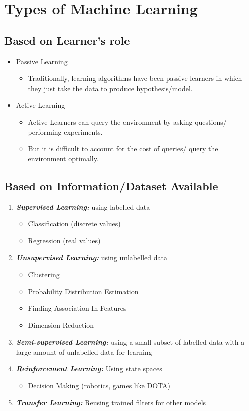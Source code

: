 \documentclass[a4paper]{article}
\begin{document}
\section{Types of Machine Learning}
\subsection{Based on Learner's role}
\begin{itemize}
	\item Passive Learning
	\begin{itemize}[label=$\circ$]
		\item Traditionally, learning algorithms have been passive learners in which they just take the data to produce hypothesis/model.
	\end{itemize}
	\item Active Learning
	\begin{itemize}[label=$\circ$]
		\item Active Learners can query the environment by asking questions/ performing experiments.
		\item But it is difficult to account for the cost of queries/ query the environment optimally.
	\end{itemize}
\end{itemize}
\subsection{Based on Information/Dataset Available}
\begin{enumerate}
	\item \textbf{\textit{Supervised Learning:}} using labelled data
	\begin{itemize}[label=$\circ$]
		\item Classification (discrete values)
		\item Regression (real values)
	\end{itemize}
	\item \textbf{\textit{Unsupervised Learning:}} using unlabelled data
	\begin{itemize}[label=$\circ$]
		\item Clustering
		\item Probability Distribution Estimation
		\item Finding Association In Features
		\item Dimension Reduction
	\end{itemize}
	\item \textbf{\textit{Semi-supervised Learning:}} using a small subset of labelled data with a large amount of unlabelled data for learning
	\item \textbf{\textit{Reinforcement Learning:}} Using state spaces
	\begin{itemize}[label=$\circ$]
		\item Decision Making (robotics, games like DOTA)
	\end{itemize}
	\item \textbf{\textit{Transfer Learning:}} Reusing trained filters for other models
\end{enumerate}
\end{document}
